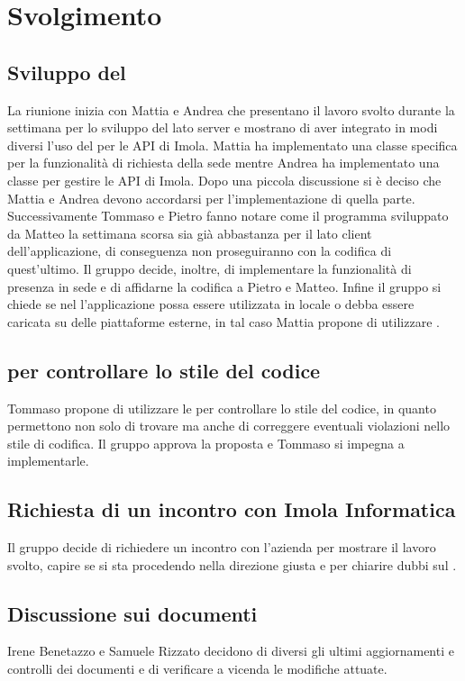 \section{Svolgimento}
\subsection{Sviluppo del }
La riunione inizia con Mattia e Andrea che presentano il lavoro svolto durante la settimana per lo sviluppo del  lato server e
mostrano di aver integrato in modi diversi l'uso del  per le API di Imola. Mattia ha implementato
una classe specifica per la funzionalità di richiesta della sede mentre Andrea ha implementato una classe per gestire le API di Imola.
Dopo una piccola discussione si è deciso che Mattia e Andrea devono accordarsi per l'implementazione di quella parte. Successivamente
Tommaso e Pietro fanno notare come il programma sviluppato da Matteo la settimana scorsa sia già abbastanza per il lato client dell'applicazione,
di conseguenza non proseguiranno con la codifica di quest'ultimo. Il gruppo decide, inoltre, di implementare la funzionalità di presenza in sede
e di affidarne la codifica a Pietro e Matteo. Infine il gruppo si chiede se nel  l'applicazione possa essere utilizzata 
in locale o debba essere caricata su delle piattaforme esterne, in tal caso Mattia propone di utilizzare .

\subsection{ per controllare lo stile del codice}
Tommaso propone di utilizzare le  per controllare lo stile del codice, in quanto permettono non solo
di trovare ma anche di correggere eventuali violazioni nello stile di codifica. Il gruppo approva la proposta e Tommaso
si impegna a implementarle.

\subsection{Richiesta di un incontro con Imola Informatica}
Il gruppo decide di richiedere un incontro con l'azienda per mostrare il lavoro svolto, capire se si sta procedendo
nella direzione giusta e per chiarire dubbi sul .

\subsection{Discussione sui documenti}
Irene Benetazzo e Samuele Rizzato decidono di diversi gli ultimi aggiornamenti e controlli dei documenti e
di verificare a vicenda le modifiche attuate.
